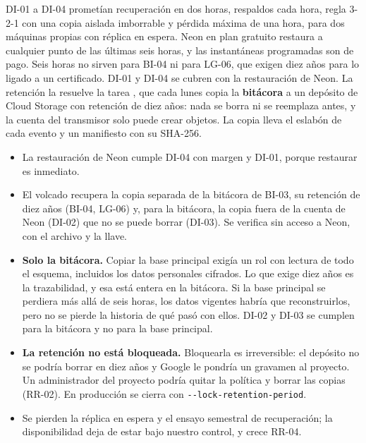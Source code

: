 \documentclass[11pt,a4paper]{article}
\theoremstyle{definition}
\theoremstyle{remark}
\newcommand{\code}[1]{\texttt{#1}}
\begin{document}
\adrctx DI-01 a DI-04 prometían recuperación en dos horas, respaldos cada hora,
regla 3-2-1 con una copia aislada imborrable y pérdida máxima de una hora,
para dos máquinas propias con réplica en espera. Neon en plan gratuito
restaura a cualquier punto de las últimas seis horas, y las instantáneas
programadas son de pago. Seis horas no sirven para BI-04 ni para LG-06, que
exigen diez años para lo ligado a un certificado.
\adrdec DI-01 y DI-04 se cubren con la restauración de Neon. La retención la
resuelve la tarea , que cada lunes copia la \textbf{bitácora}
a un depósito de Cloud Storage con retención de diez años: nada se borra ni
se reemplaza antes, y la cuenta del transmisor solo puede crear objetos. La
copia lleva el eslabón de cada evento y un manifiesto con su SHA-256.
\adrpos
\begin{itemize}
  \item La restauración de Neon cumple DI-04 con margen y DI-01, porque
    restaurar es inmediato.
  \item El volcado recupera la copia separada de la bitácora de BI-03, su
    retención de diez años (BI-04, LG-06) y, para la bitácora, la copia fuera
    de la cuenta de Neon (DI-02) que no se puede borrar (DI-03). Se verifica
    sin acceso a Neon, con el archivo y la llave.
\end{itemize}
\adrneg
\begin{itemize}
  \item \textbf{Solo la bitácora.} Copiar la base principal exigía un rol con
    lectura de todo el esquema, incluidos los datos personales cifrados. Lo
    que exige diez años es la trazabilidad, y esa está entera en la bitácora.
    Si la base principal se perdiera más allá de seis horas, los datos
    vigentes habría que reconstruirlos, pero no se pierde la historia de qué
    pasó con ellos. DI-02 y DI-03 se cumplen para la bitácora y no para la
    base principal.
  \item \textbf{La retención no está bloqueada.} Bloquearla es irreversible:
    el depósito no se podría borrar en diez años y Google le pondría un
    gravamen al proyecto. Un administrador del proyecto podría quitar la
    política y borrar las copias (RR-02). En producción se cierra con
    \code{-{}-lock-retention-period}.
  \item Se pierden la réplica en espera y el ensayo semestral de recuperación;
    la disponibilidad deja de estar bajo nuestro control, y crece RR-04.
\end{itemize}
\end{document}
